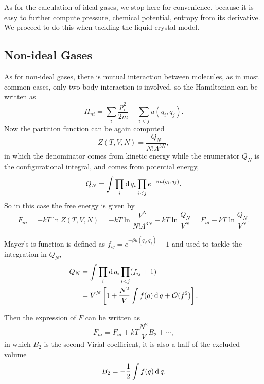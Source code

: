 As for the calculation of ideal gases, we stop here for convenience, because it is easy to further compute pressure, chemical potential, entropy from its derivative. We proceed to do this when tackling the liquid crystal model.

\subsection{Non-ideal Gases}
As for non-ideal gases, there is mutual interaction between molecules, as in most common cases, only two-body interaction is involved, so the Hamiltonian can be written as
\begin{equation}
	H_{ni}=\sum_i\frac{p_i^2}{2m}+\sum_{i<j}u(q_i,q_j).
\end{equation}
Now the partition function can be again computed
\begin{equation}
	Z(T,V,N) = \frac{Q_N}{N!\Lambda^{3N}},
\end{equation}
in which the denominator comes from kinetic energy while the enumerator $Q_N$ is the configurational integral, and comes from potential energy,
\begin{equation}
	Q_N = \int\prod_i\operatorname{d}q_i\prod_{i<j}e^{-\beta u(q_i,q_j)}.
\end{equation}
So in this case the free energy is given by
\begin{equation}
	F_{ni} = -kT\ln Z(T,V,N) = -kT\ln\frac{V^N}{N!\Lambda^{3N}} - kT\ln\frac{Q_N}{V^N} = F_{id} - kT\ln\frac{Q_N}{V^N}.
\end{equation}

Mayer's is function is defined as $f_{ij} = e^{-\beta u(q_i,q_j)}-1$ and used to tackle the integration in $Q_N$,
\begin{equation}
	\begin{split}
		Q_N &= \int\prod_i\operatorname{d}q_i\prod_{i<j}(f_{ij}+1)\\
		&=V^N\left[1+\frac{N^2}{V}\int f(q)\operatorname{d}q+\mathcal{O}(f^2)\right].
	\end{split}
\end{equation}

Then the expression of $F$ can be written as
\begin{equation}
	F_{ni} = F_{id} + kT\frac{N^2}{V}B_2+\cdots,
\end{equation}
in which $B_2$ is the second Virial coefficient, it is also a half of the excluded volume
\begin{equation}
	B_2 = -\frac{1}{2}\int f(q)\operatorname{d}q.
\end{equation}

